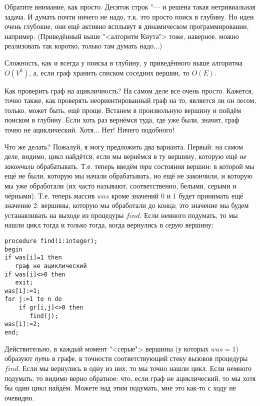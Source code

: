 Обратите внимание, как просто. Десяток строк "--- и решена такая нетривиальная задача. 
И думать почти ничего не надо, т.к. это просто поиск в глубину. Но идеи очень глубокие, они ещё 
активно всплывут в динамическом программировании, например. (Приведённый выше "<алгоритм Кнута">
тоже, наверное, можно реализовать так коротко, только там думать надо...)

Сложность, как и всегда у поиска в глубину, у приведённого выше алгоритма $O(V^2)$, а, если граф 
хранить списком соседних вершин, то $O(E)$.

Как проверить граф на ацикличность? На самом деле все очень просто. Кажется, точно также, как проверять 
неориентированный граф на то, является ли он лесом, только, может быть, ещё проще. Встанем в 
произвольную вершину и пойдём поиском в глубину. Если хоть раз вернёмся туда, где уже были, значит, 
граф точно не ациклический. Хотя... Нет! Ничего подобного!


Что же делать? Пожалуй, я могу предложить два варианта. Первый: на самом деле, видимо, цикл 
найдётся, если мы вернёмся в ту вершину, которую ещё \textit{не закончили} обрабатывать. Т.е. теперь введём 
\textit{три} состояния вершин: в которой мы ещё не были, которую мы начали обрабатывать, но ещё не 
закончили, и которую мы уже обработали (их часто называют, соответственно, белыми, серыми и чёрными). 
Т.е. теперь массив $was$ кроме значений 0 и 1 будет принимать ещё значение 2: вершины, которую мы 
обработали до конца; это значение мы будем устанавливать на выходе из процедуры $find$. Если 
немного подумать, то мы нашли цикл тогда и только тогда, когда вернулись в \textit{серую} вершину:
\begin{codesample}\begin{verbatim}
procedure find(i:integer);
begin
if was[i]=1 then
   граф не ациклический
if was[i]<>0 then
   exit;
was[i]:=1;
for j:=1 to n do
    if gr[i,j]<>0 then
       find(j);
was[i]:=2;
end;
\end{verbatim}\end{codesample}
Действительно, в каждый момент "<серые"> вершины (у которых $was=1$) образуют \textit{путь} в графе, в 
точности соответствующий стеку вызовов процедуры $find$. Если мы вернулись в одну из них, то мы 
точно нашли цикл. Если немного подумать, то видимо верно обратное: что, если граф не ациклический, 
то мы хотя бы один цикл найдём. Можете над этим подумать, мне это как-то с ходу не очевидно.


